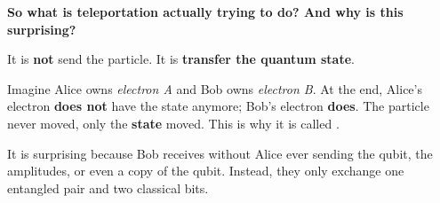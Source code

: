 \highspace
\begin{flushleft}
    \textcolor{Green3}{ \textbf{So what is teleportation actually trying to do? And why is this surprising?}}
\end{flushleft}
It is \textbf{not} send the particle. It is \textbf{transfer the quantum state}.

\highspace
Imagine Alice owns \emph{electron A} and Bob owns \emph{electron B}. At the end, Alice's electron \textbf{does not} have the state anymore; Bob's electron \textbf{does}. The particle never moved, only the \textbf{state} moved. This is why it is called .

\highspace
It is surprising because Bob receives \ket{\psi} without Alice ever sending the qubit, the amplitudes, or even a copy of the qubit. Instead, they only exchange one entangled pair and two classical bits.

\newpage

